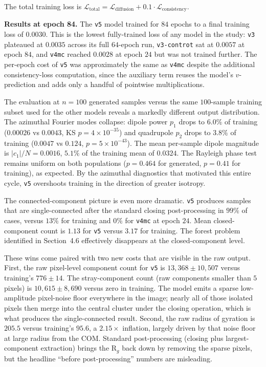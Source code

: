 \documentclass[11pt]{article}
\begin{document}
The total training loss is $\mathcal{L}_{\text{total}} = \mathcal{L}_{\text{diffusion}} + 0.1 \cdot \mathcal{L}_{\text{consistency}}$.

\textbf{Results at epoch 84.} The \texttt{v5} model trained for $84$ epochs to a final training loss of $0.0030$. This is the lowest fully-trained loss of any model in the study: \texttt{v3} plateaued at $0.0035$ across its full $64$-epoch run, \texttt{v3-controt} sat at $0.0057$ at epoch $84$, and \texttt{v4mc} reached $0.0028$ at epoch $24$ but was not trained further. The per-epoch cost of \texttt{v5} was approximately the same as \texttt{v4mc} despite the additional consistency-loss computation, since the auxiliary term reuses the model's $v$-prediction and adds only a handful of pointwise multiplications.

The evaluation at $n = 100$ generated samples versus the same $100$-sample training subset used for the other models reveals a markedly different output distribution. The azimuthal Fourier modes collapse: dipole power $p_1$ drops to $6.0\%$ of training ($0.00026$ vs $0.0043$, KS $p = 4 \times 10^{-35}$) and quadrupole $p_2$ drops to $3.8\%$ of training ($0.0047$ vs $0.124$, $p = 5 \times 10^{-43}$). The mean per-sample dipole magnitude is $|c_1|/N = 0.0016$, $5.1\%$ of the training mean of $0.0324$. The Rayleigh phase test remains uniform on both populations ($p = 0.464$ for generated, $p = 0.41$ for training), as expected. By the azimuthal diagnostics that motivated this entire cycle, \texttt{v5} overshoots training in the direction of greater isotropy.

The connected-component picture is even more dramatic. \texttt{v5} produces samples that are single-connected after the standard closing post-processing in $99\%$ of cases, versus $13\%$ for training and $0\%$ for \texttt{v4mc} at epoch $24$. Mean closed-component count is $1.13$ for \texttt{v5} versus $3.17$ for training. The forest problem identified in Section~4.6 effectively disappears at the closed-component level.

These wins come paired with two new costs that are visible in the raw output. First, the raw pixel-level component count for \texttt{v5} is $13{,}368 \pm 10{,}507$ versus training's $776 \pm 14$. The stray-component count (raw components smaller than $5$ pixels) is $10{,}615 \pm 8{,}690$ versus zero in training. The model emits a sparse low-amplitude pixel-noise floor everywhere in the image; nearly all of those isolated pixels then merge into the central cluster under the closing operation, which is what produces the single-connected result. Second, the raw radius of gyration is $205.5$ versus training's $95.6$, a $2.15\times$ inflation, largely driven by that noise floor at large radius from the COM. Standard post-processing (closing plus largest-component extraction) brings the R$_g$ back down by removing the sparse pixels, but the headline ``before post-processing'' numbers are misleading.
\end{document}

